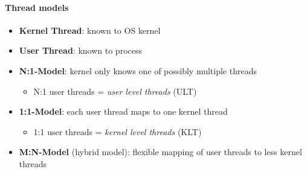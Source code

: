 \paragraph{Thread models}
\begin{itemize}
  \item \textbf{Kernel Thread}: known to OS kernel
  \item \textbf{User Thread}: known to process
  \item \textbf{N:1-Model}: kernel only knows one of possibly multiple threads
  \begin{itemize}
    \item N:1 user threads = \emph{user level threads} (ULT)
  \end{itemize}
  \item \textbf{1:1-Model}: each user thread maps to one kernel thread
  \begin{itemize}
    \item 1:1 user threads = \emph{kernel level threads} (KLT)
  \end{itemize}
  \item \textbf{M:N-Model} (hybrid model): flexible mapping of user threads to less kernel threads 
\end{itemize}

